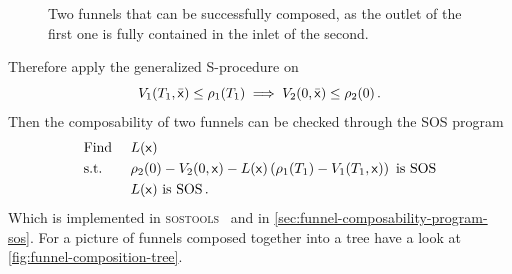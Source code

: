 \begin{figure}
  \caption[Two composable funnels]{Two funnels that can be successfully composed, as the outlet of the
    first one is fully contained in the inlet of the second.}
  \label{fig:two-funnels-composed}
\end{figure}

Therefore apply the generalized S-procedure on
\begin{equation}
  V_1(T_1,\bar{{\mathbf{\mathsf{x}}}}) \leq \rho_1(T_1) \implies V_2(0, \bar{{\mathbf{\mathsf{x}}}}) \leq \rho_2(0) \, .
\end{equation}
Then the composability of two funnels can be checked through the \ac{SOS}
program
\begin{align}
  & \text{Find } && L({\mathbf{\mathsf{x}}}) \\
  & \text{s.t. } && \rho_2(0) - V_2(0,{\mathbf{\mathsf{x}}}) - L({\mathbf{\mathsf{x}}})\left( \rho_1(T_1) - V_1(T_1,{\mathbf{\mathsf{x}}}) \right) \text{ is SOS} \nonumber \\ 
  &&& L({\mathbf{\mathsf{x}}}) \text{ is SOS} \, . \nonumber
\end{align}
Which is implemented in \textsc{sostools}~\cite{sostools} and \matlab{} in
\cref{sec:funnel-composability-program-sos}. For a picture of funnels composed
together into a tree have a look at \cref{fig:funnel-composition-tree}.
